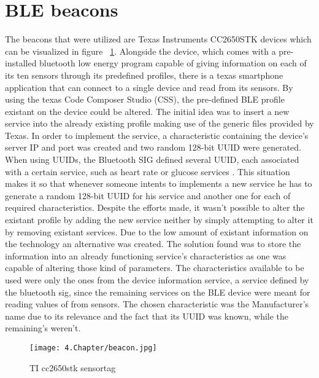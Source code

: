 \section{ \ac{BLE} beacons}
\label{sec:beacon}


The beacons that were utilized are Texas Instruments CC2650STK devices which can be visualized in figure ~\ref{fig:beacon}. Alongside the device, which comes with a pre-installed bluetooth low energy program capable of giving information on each of its ten sensors through its predefined profiles, there is a texas smartphone application that can connect to a single device and read from its sensors. By using the texas Code Composer Studio (CSS), the pre-defined \ac{BLE} profile existant on the device could be altered.
The initial idea was to insert a new service into the already existing profile making use of the generic files provided by Texas. 
In order to implement the service, a characteristic containing the device's server IP and port was created and two random 128-bit UUID were generated. When using UUIDs, the Bluetooth SIG defined several UUID, each associated with a certain service, such as heart rate or glucose services \cite{bleservices}. This situation makes it so that whenever someone intents to implements a new service he has to generate a random 128-bit UUID for his service and another one for each of required characteristics.
Despite the efforts made, it wasn't possible to alter the existant profile by adding the new service neither by simply attempting to alter it by removing existant services. Due to the low amount of existant information on the technology an alternative was created. The solution found was to store the information into an already functioning service's characteristics as one was capable of altering those kind of parameters. The characteristics available to be used were only the ones from the device information service, a service defined by the bluetooth sig, since the remaining services on the \ac{BLE} device were meant for reading values of from sensors. The chosen characteristic was the Manufacturer's name due to its relevance and the fact that its UUID was known, while the remaining's weren't.


\begin{figure}
	\centering
		\texttt{[image: 4.Chapter/beacon.jpg]}
	\caption[TI cc2650stk sensortag]{TI cc2650stk sensortag}
	\label{fig:beacon}
\end{figure}
